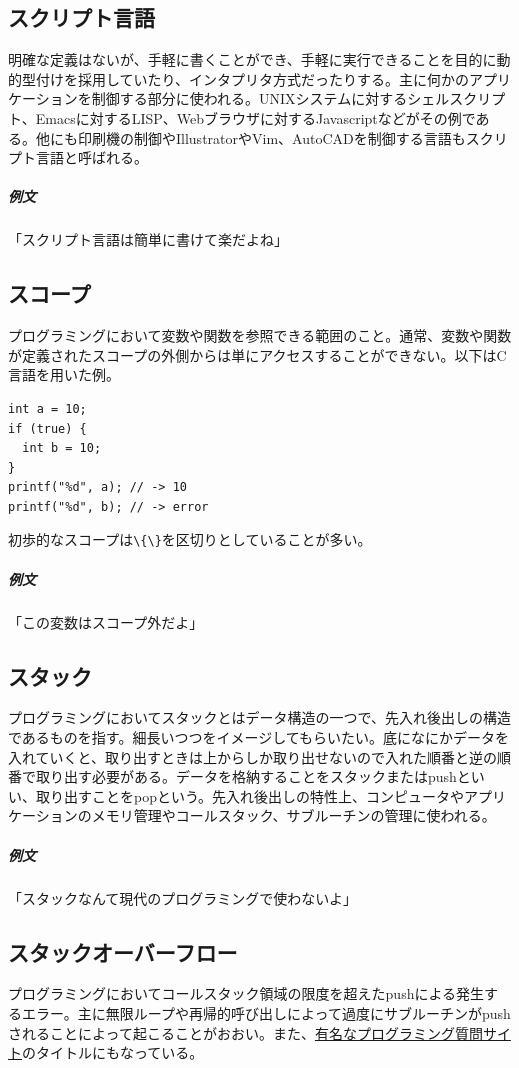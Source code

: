 \documentclass[a4paper]{ltjsreport}
\newcommand{\link}[2]{\href{#2}{#1}}
\newcommand{\terlogy}[2][|]{\colorbox{terlogy}{\texttt{\lstinline#1#2#1}}}
\begin{document}
\subsection{スクリプト言語}
明確な定義はないが、手軽に書くことができ、手軽に実行できることを目的に動的型付けを採用していたり、インタプリタ方式だったりする。主に何かのアプリケーションを制御する部分に使われる。UNIXシステムに対するシェルスクリプト、Emacsに対するLISP、Webブラウザに対するJavascriptなどがその例である。他にも印刷機の制御やIllustratorやVim、AutoCADを制御する言語もスクリプト言語と呼ばれる。

\subparagraph{例文}「スクリプト言語は簡単に書けて楽だよね」

\subsection{スコープ}
プログラミングにおいて変数や関数を参照できる範囲のこと。通常、変数や関数が定義されたスコープの外側からは単にアクセスすることができない。以下はC言語を用いた例。

\lstset{language=C}
\begin{lstlisting}
int a = 10;
if (true) {
  int b = 10;
}
printf("%d", a); // -> 10
printf("%d", b); // -> error
\end{lstlisting}

初歩的なスコープは\terlogy{\{\}}を区切りとしていることが多い。

\subparagraph{例文}「この変数はスコープ外だよ」

\subsection{スタック}
プログラミングにおいてスタックとはデータ構造の一つで、先入れ後出しの構造であるものを指す。細長いつつをイメージしてもらいたい。底になにかデータを入れていくと、取り出すときは上からしか取り出せないので入れた順番と逆の順番で取り出す必要がある。データを格納することをスタックまたはpushといい、取り出すことをpopという。先入れ後出しの特性上、コンピュータやアプリケーションのメモリ管理やコールスタック、サブルーチンの管理に使われる。

\subparagraph{例文}「スタックなんて現代のプログラミングで使わないよ」

\subsection{スタックオーバーフロー}
プログラミングにおいてコールスタック領域の限度を超えたpushによる発生するエラー。主に無限ループや再帰的呼び出しによって過度にサブルーチンがpushされることによって起こることがおおい。また、\link{有名なプログラミング質問サイト}{https://ja.stackoverflow.com/}のタイトルにもなっている。
\end{document}
